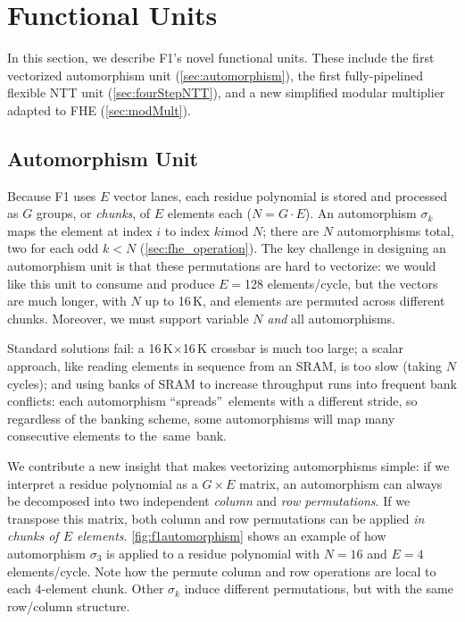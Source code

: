 \section{Functional Units}
\label{sec:FUs}

In this section, we describe F1's novel functional units. These include the
first vectorized automorphism unit (\autoref{sec:automorphism}), the first
fully-pipelined flexible NTT unit (\autoref{sec:fourStepNTT}), and a new
simplified modular multiplier adapted to FHE (\autoref{sec:modMult}).

\subsection{Automorphism Unit}\label{sec:automorphism}

\figFOneAutomorphism

Because F1 uses $E$ vector lanes, each residue polynomial is stored and
processed as $G$ groups, or \emph{chunks}, of $E$ elements each ($N=G\cdot E$).
An automorphism $\sigma_k$ maps the element at index $i$ to index $ki \textrm{
mod } N$; there are $N$ automorphisms total, two for each odd $k < N$
(\autoref{sec:fhe_operation}). The key challenge in designing an automorphism
unit is that these permutations are hard to vectorize: we would like this unit
to consume and produce $E=$128 elements/cycle, but the vectors are much longer,
with $N$ up to 16\,K, and elements are permuted across different chunks.
Moreover, we must support variable $N$ \emph{and} all automorphisms.

Standard solutions fail: a 16\,K$\times$16\,K crossbar is much too large; a
scalar approach, like reading elements in sequence from an SRAM, is too slow
(taking $N$ cycles); and using banks of SRAM to increase throughput runs into
frequent bank conflicts: each automorphism ``spreads''~elements with a
different stride, so regardless of the banking scheme, some automorphisms will
map many consecutive elements to the~same~bank.

We contribute a new insight that makes vectorizing automorphisms simple: if we
interpret a residue polynomial as a $G \times E$ matrix, an automorphism can
always be decomposed into two independent \emph{column} and \emph{row
permutations}. If we transpose this matrix, both column and row permutations
can be applied \emph{in chunks of $E$ elements}. \autoref{fig:f1automorphism}
shows an example of how automorphism $\sigma_3$ is applied to a residue
polynomial with $N=16$ and $E=4$ elements/cycle. Note how the permute column
and row operations are local to each $4$-element chunk. Other $\sigma_k$ induce
different permutations, but with the same row/column structure.

